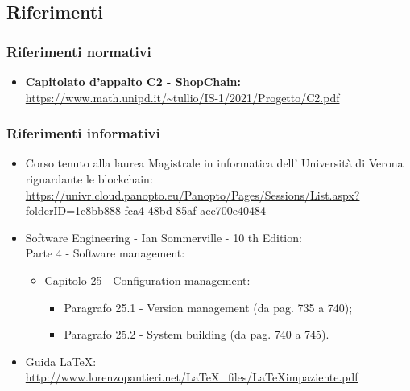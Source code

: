 \subsection{Riferimenti}

\subsubsection{Riferimenti normativi}
\begin{itemize}
    \item \textbf{Capitolato d'appalto C2 - ShopChain:} \\
    \url{https://www.math.unipd.it/~tullio/IS-1/2021/Progetto/C2.pdf}
\end{itemize}

\subsubsection{Riferimenti informativi}
\begin {itemize}
    \item Corso tenuto alla laurea Magistrale in informatica dell' Università di Verona riguardante le blockchain\glo: \\
    \url{https://univr.cloud.panopto.eu/Panopto/Pages/Sessions/List.aspx?folderID=1c8bb888-fca4-48bd-85af-acc700e40484}
    
    \item Software Engineering - Ian Sommerville - 10 th Edition:\\
    Parte 4 - Software management:
    \begin{itemize}
        \item Capitolo 25 - Configuration management:
    
    \begin{itemize}
        \item Paragrafo 25.1 - Version management (da pag. 735 a 740);
        \item Paragrafo 25.2 - System building (da pag. 740 a 745).
    \end{itemize}
\end{itemize}
    \item Guida \LaTeX:\\
    \url{http://www.lorenzopantieri.net/LaTeX_files/LaTeXimpaziente.pdf}
\end{itemize}
